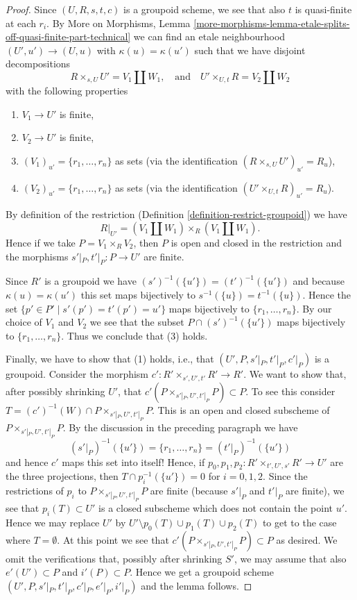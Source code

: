 \begin{proof}
Since $(U, R, s, t, c)$ is a groupoid scheme, we see that also
$t$ is quasi-finite at each $r_i$. By
More on Morphisms,
Lemma \ref{more-morphisms-lemma-etale-splits-off-quasi-finite-part-technical}
we can find an etale neighbourhood $(U', u') \to (U, u)$ with
$\kappa(u) = \kappa(u')$ such that we have disjoint decompositions
$$
R \times_{s, U} U' = V_1 \coprod W_1,
\quad\text{and}\quad
U' \times_{U, t} R = V_2 \coprod W_2
$$
with the following properties
\begin{enumerate}
\item $V_1 \to U'$ is finite,
\item $V_2 \to U'$ is finite,
\item $(V_1)_{u'} = \{r_1, \ldots, r_n\}$ as sets (via the identification
$(R \times_{s, U} U')_{u'} = R_u$),
\item $(V_2)_{u'} = \{r_1, \ldots, r_n\}$ as sets (via the identification
$(U' \times_{U, t} R)_{u'} = R_u$).
\end{enumerate}
By definition of the restriction
(Definition \ref{definition-restrict-groupoid})
we have
$$
R|_{U'} = (V_1 \coprod W_1) \times_R (V_1 \coprod W_1).
$$
Hence if we take $P = V_1 \times_R V_2$, then $P$ is open and closed
in the restriction and the morphisms $s'|_P, t'|_P : P \to U'$ are finite.

\medskip\noindent
Since $R'$ is a groupoid we have $(s')^{-1}(\{u'\}) = (t')^{-1}(\{u'\})$
and because $\kappa(u) = \kappa(u')$ this set maps bijectively to
$s^{-1}(\{u\}) = t^{-1}(\{u\})$. Hence the set
$\{p' \in P' \mid s'(p') = t'(p') = u'\}$
maps bijectively to $\{r_1, \ldots, r_n\}$.
By our choice of $V_1$ and $V_2$ we see that the subset
$P \cap (s')^{-1}(\{u'\})$ maps bijectively
to $\{r_1, \ldots, r_n\}$. Thus we conclude that (3) holds.

\medskip\noindent
Finally, we have to show that (1) holds, i.e., that
$(U', P, s'|_P, t'|_P, c'|_P)$ is a groupoid.
Consider the morphism $c' : R' \times_{s', U', t'} R' \to R'$.
We want to show that, after possibly shrinking $U'$, that
$c'(P \times_{s'|_P, U', t'|_P} P) \subset P$. To see this
consider $T = (c')^{-1}(W) \cap P \times_{s'|_P, U', t'|_P} P$.
This is an open and closed subscheme of $P \times_{s'|_P, U', t'|_P} P$.
By the discussion in the preceding paragraph we have
$$
(s'|_P)^{-1}(\{u'\}) = \{r_1, \ldots, r_n\} = (t'|_P)^{-1}(\{u'\})
$$
and hence $c'$ maps this set into itself! Hence, if
$p_0, p_1, p_2: R' \times_{t',U',s'} R' \rightarrow U'$ are
the three projections, then $T \cap p_i^{-1}(\{u'\}) = 0$ for $i = 0, 1, 2$.
Since the restrictions of $p_i$ to $P \times_{s'|_P, U', t'|_P} P$ are finite
(because $s'|_P$ and $t'|_P$ are finite), we see that $p_i(T) \subset U'$
is a closed subscheme which does not contain the point $u'$.
Hence we may replace $U'$ by $U' \setminus p_0(T) \cup p_1(T) \cup p_2(T)$
to get to the case where $T = \emptyset$. At this point
we see that $c'(P \times_{s'|_P, U', t'|_P} P) \subset P$
as desired. We omit the verifications that, possibly after shrinking $S'$,
we may assume that also $e'(U') \subset P$ and $i'(P) \subset P$.
Hence we get a groupoid scheme $(U', P, s'|_P, t'|_P, c'|_P, e'|_P, i'|_P)$
and the lemma follows.
\end{proof}

